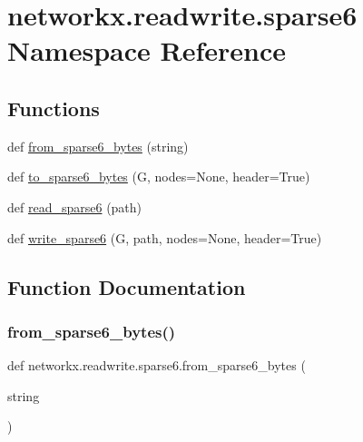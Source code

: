 \hypertarget{namespacenetworkx_1_1readwrite_1_1sparse6}{}\section{networkx.\+readwrite.\+sparse6 Namespace Reference}
\label{namespacenetworkx_1_1readwrite_1_1sparse6}
\subsection*{Functions}
\begin{DoxyCompactItemize}
\item 
def \hyperlink{namespacenetworkx_1_1readwrite_1_1sparse6_aa3080d9431b917bfe39f018a4dc89ecb}{from\+\_\+sparse6\+\_\+bytes} (string)
\item 
def \hyperlink{namespacenetworkx_1_1readwrite_1_1sparse6_ab8c3216ab381d1860445bb547037a4c4}{to\+\_\+sparse6\+\_\+bytes} (G, nodes=None, header=True)
\item 
def \hyperlink{namespacenetworkx_1_1readwrite_1_1sparse6_a55594fbb44cb9b1479a0a10869e18f80}{read\+\_\+sparse6} (path)
\item 
def \hyperlink{namespacenetworkx_1_1readwrite_1_1sparse6_af3ccac7f6884a29ce94fc9ff1af89845}{write\+\_\+sparse6} (G, path, nodes=None, header=True)
\end{DoxyCompactItemize}


\subsection{Function Documentation}
\mbox{\label{namespacenetworkx_1_1readwrite_1_1sparse6_aa3080d9431b917bfe39f018a4dc89ecb}} 
\subsubsection{\texorpdfstring{from\+\_\+sparse6\+\_\+bytes()}{from\_sparse6\_bytes()}}
{\footnotesize\ttfamily def networkx.\+readwrite.\+sparse6.\+from\+\_\+sparse6\+\_\+bytes (\begin{DoxyParamCaption}\item[{}]{string }\end{DoxyParamCaption})}

